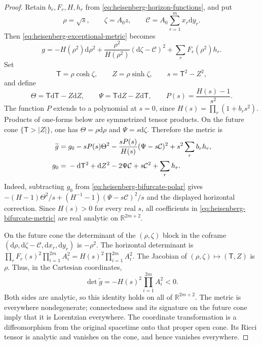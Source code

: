 \documentclass[10pt,a4paper]{article}
\numberwithin{equation}{section}
\theoremstyle{definition}
\theoremstyle{remark}
\newcommand{\dd}{\mathrm d}
\begin{document}
\begin{proof}
Retain $b_r,F_r,H,h_r$ from
\eqref{eq:heisenberg-horizon-functions}, and put
\[
 \rho=\sqrt s,\qquad \zeta=A_0z,\qquad
 \mathcal C=A_0\sum_{r=1}^m x_r\dd y_r.
\]
Then \eqref{eq:heisenberg-exceptional-metric} becomes
\begin{equation}
 g=-H(\rho^2)\dd\rho^2
   +\frac{\rho^2}{H(\rho^2)}(\dd\zeta-\mathcal C)^2
   +\sum_rF_r(\rho^2)h_r.
 \label{eq:heisenberg-bifurcate-polar}
\end{equation}
Set
\[
 \mathsf T=\rho\cosh\zeta,\qquad
 Z=\rho\sinh\zeta,\qquad
 s=\mathsf T^2-Z^2,
\]
and define
\[
 \Theta=\mathsf T\dd\mathsf T-Z\dd Z,\qquad
 \Psi=\mathsf T\dd Z-Z\dd\mathsf T,\qquad
 P(s)=\frac{H(s)-1}{s^2}.
\]
The function $P$ extends to a polynomial at $s=0$, since
$H(s)=\prod_r(1+b_rs^2)$.  Products of one-forms below are
symmetrized tensor products.  On the future cone
$\{\mathsf T>|Z|\}$, one has
$\Theta=\rho\dd\rho$ and $\Psi=s\dd\zeta$.  Therefore the metric is
\begin{align}
 \widetilde g={}&g_0-sP(s)\Theta^2
   -\frac{sP(s)}{H(s)}(\Psi-s\mathcal C)^2
   +s^2\sum_r b_rh_r,\label{eq:heisenberg-bifurcate-metric}\\
 g_0={}&-\dd\mathsf T^2+\dd Z^2
        -2\Psi\mathcal C+s\mathcal C^2+\sum_rh_r.
 \notag
\end{align}
Indeed, subtracting $g_0$ from
\eqref{eq:heisenberg-bifurcate-polar} gives
$-(H-1)\Theta^2/s+(H^{-1}-1)(\Psi-s\mathcal C)^2/s$
and the displayed horizontal correction.
Since $H(s)>0$ for every real $s$, all coefficients in
\eqref{eq:heisenberg-bifurcate-metric} are real analytic on
$\mathbb R^{2m+2}$.

On the future cone the determinant of the $(\rho,\zeta)$ block
in the coframe $(\dd\rho,\dd\zeta-\mathcal C,\dd x_r,\dd y_r)$
is $-\rho^2$.  The horizontal determinant is
$\prod_rF_r(s)^2\prod_{i=1}^{2m}A_i^2
=H(s)^2\prod_{i=1}^{2m}A_i^2$.
The Jacobian of $(\rho,\zeta)\mapsto(\mathsf T,Z)$ is $\rho$.
Thus, in the Cartesian coordinates,
\begin{equation}
 \det\widetilde g=-H(s)^2\prod_{i=1}^{2m}A_i^2<0.
 \label{eq:heisenberg-bifurcate-determinant}
\end{equation}
Both sides are analytic, so this identity holds on all of
$\mathbb R^{2m+2}$.  The metric is everywhere nondegenerate;
connectedness and its signature on the future cone imply that it
is Lorentzian everywhere.  The coordinate transformation is a
diffeomorphism from the original spacetime onto that proper open
cone.  Its Ricci tensor is analytic and vanishes on the cone,
and hence vanishes everywhere.


\end{proof}
\end{document}
